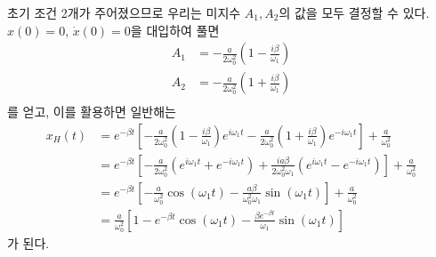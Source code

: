 \documentclass[chapter, oneside, b5paper]{oblivoir}
\theoremstyle{plain}
\theoremstyle{definition}
\theoremstyle{remark}
\begin{document}
초기 조건 2개가 주어졌으므로 우리는 미지수 $A_1, A_2$의 값을 모두 결정할 수 있다. $x(0)=0$, $\dot{x}(0)=0$을 대입하여 풀면
\begin{equation}
    \begin{aligned}
        A_1 &= -\frac{a}{2\omega_0^2} \left(1-\frac{i\beta}{\omega_1} \right) \\
        A_2 &= -\frac{a}{2\omega_0^2} \left(1+\frac{i\beta}{\omega_1} \right) \\
    \end{aligned}
    \label{eq:2.84}
\end{equation}를 얻고, 이를 활용하면 일반해는
\begin{equation}
    \begin{split}
        x_H(t) &= e^{-\beta t}\left[-\frac{a}{2\omega_0^2} \left(1-\frac{i\beta}{\omega_1} \right)e^{i\omega_1t}-\frac{a}{2\omega_0^2} \left(1+\frac{i\beta}{\omega_1} \right)e^{-i\omega_1t}\right] + \frac{a}{\omega_0^2} \\
        &= e^{-\beta t}\left[-\frac{a}{2\omega_0^2}(e^{i\omega_1t}+e^{-i\omega_1t})+\frac{ia\beta}{2\omega_0^2 \omega_1}(e^{i\omega_1t}-e^{-i\omega_1t})\right] + \frac{a}{\omega_0^2} \\
        &= e^{-\beta t}\left[-\frac{a}{\omega_0^2}\cos{(\omega_1t)}-\frac{a\beta}{\omega_0^2 \omega_1}\sin{(\omega_1t)}\right] + \frac{a}{\omega_0^2} \\
        &= \frac{a}{\omega_0^2}\left[1-e^{-\beta t}\cos{(\omega_1t)}-\frac{\beta e^{-\beta t}}{\omega_1}\sin{(\omega_1t)}\right] \label{eq:2.85}
    \end{split}
\end{equation}
가 된다.
\end{document}
